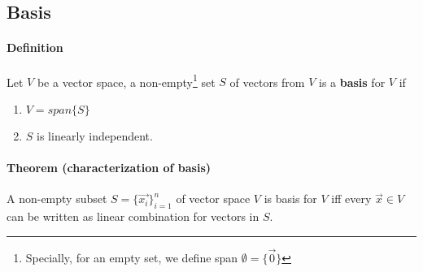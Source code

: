 \documentclass[11pt]{article}
\begin{document}
	\subsection{Basis}
	\paragraph{Definition} Let $V$ be a vector space, a non-empty\footnote{Specially, for an empty set, we define span $\emptyset = \{\vec{0}\}$} set $S$ of vectors from $V$ is a \textbf{basis} for $V$ if 
		\begin{enumerate}
			\item $V = span\{S\}$
			\item $S$ is linearly independent.
		\end{enumerate}
	\paragraph{Theorem (characterization of basis)}A non-empty subset $S = \{\vec{x_i}\}_{i=1}^n$ of vector space $V$ is basis for $V$ iff every $\vec{x} \in V$ can be written 
	 as linear combination for vectors in $S$.
	\newpage 
\end{document}
